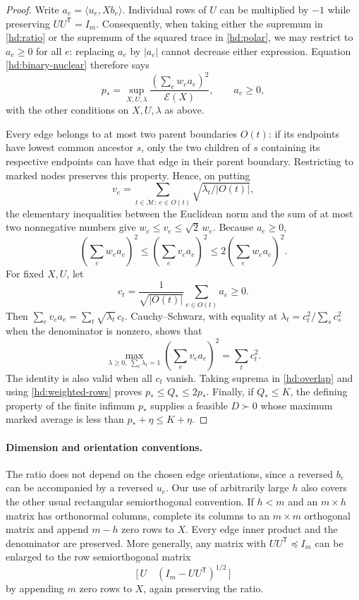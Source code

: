 \begin{proof}
Write $a_e=\langle u_e,Xb_e\rangle$.  Individual rows of $U$ can be
multiplied by $-1$ while preserving $UU^{\mathsf T}=I_m$.
Consequently, when taking either the supremum in \eqref{hd:ratio} or
the supremum of the squared trace in \eqref{hd:polar}, we may restrict
to $a_e\geq0$ for all $e$: replacing $a_e$ by $|a_e|$ cannot decrease
either expression.  Equation \eqref{hd:binary-nuclear} therefore says
\begin{equation}
\label{hd:weighted-rows}
 p_*=
 \sup_{X,U,\lambda}
 \frac{\left(\sum_e w_ea_e\right)^2}{\mathcal E(X)},
 \qquad a_e\geq0,
\end{equation}
with the other conditions on $X,U,\lambda$ as above.

Every edge belongs to at most two parent boundaries $O(t)$: if its
endpoints have lowest common ancestor $s$, only the two children of
$s$ containing its respective endpoints can have that edge in their
parent boundary.  Restricting to marked nodes preserves this property.
Hence, on putting
\[
 v_e=\sum_{t\in\mathcal M:\ e\in O(t)}
                    \sqrt{\lambda_t/|O(t)|},
\]
the elementary inequalities between the Euclidean norm and the sum
of at most two nonnegative numbers give
$w_e\leq v_e\leq\sqrt2\,w_e$.  Because $a_e\geq0$,
\begin{equation}
\label{hd:overlap}
 \left(\sum_e w_ea_e\right)^2
 \leq\left(\sum_e v_ea_e\right)^2
 \leq2\left(\sum_e w_ea_e\right)^2.
\end{equation}
For fixed $X,U$, let
\[
 c_t=\frac1{\sqrt{|O(t)|}}\sum_{e\in O(t)}a_e\geq0.
\]
Then $\sum_e v_ea_e=\sum_t\sqrt{\lambda_t}\,c_t$.
Cauchy--Schwarz, with equality at
$\lambda_t=c_t^2/\sum_s c_s^2$ when the denominator is nonzero,
shows that
\[
 \max_{\lambda\geq0,\ \sum_t\lambda_t=1}
       \left(\sum_e v_ea_e\right)^2
   =\sum_t c_t^2.
\]
The identity is also valid when all $c_t$ vanish.  Taking suprema in
\eqref{hd:overlap} and using \eqref{hd:weighted-rows} proves
$p_*\leq Q_*\leq2p_*$.  Finally, if $Q_*\leq K$, the defining
property of the finite infimum $p_*$ supplies a feasible $D\succ0$
whose maximum marked average is less than $p_*+\eta\leq K+\eta$.
\end{proof}

\paragraph{Dimension and orientation conventions.}
The ratio does not depend on the chosen edge orientations, since a
reversed $b_e$ can be accompanied by a reversed $u_e$.  Our use of
arbitrarily large $h$ also covers the other usual rectangular
semiorthogonal convention.  If $h<m$ and an $m\times h$ matrix has
orthonormal columns, complete its columns to an $m\times m$ orthogonal
matrix and append $m-h$ zero rows to $X$.  Every edge inner product
and the denominator are preserved.  More generally, any matrix with
$UU^{\mathsf T}\preceq I_m$ can be enlarged to the row semiorthogonal
matrix
\[
 \bigl[\,U\quad (I_m-UU^{\mathsf T})^{1/2}\,\bigr]
\]
by appending $m$ zero rows to $X$, again preserving the ratio.
